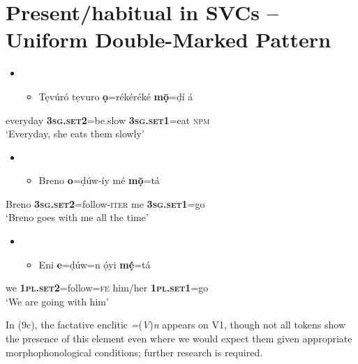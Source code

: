 \chapter[Present/habitual in SVCs – Uniform Double{}-Marked Pattern]{Present/habitual in SVCs – Uniform Double-Marked Pattern}
\label{bkm:Ref453835454}\begin{itemize}
\item \setcounter{itemize}{0}
\begin{itemize}
\item \gll Tẹvúró tẹvuro  \textbf{ọ}=rékéréké       \textbf{m\={o}̣}=ḍí       á\\
\end{itemize}
\end{itemize}
       everyday     \textbf{\textsc{3sg.set2}}=be.slow  \textbf{\textsc{3sg.set1}}=eat  \textsc{npm}\\
\glt ‘Everyday, she eats them slowly’ 
\z

\begin{itemize}
\item \setcounter{itemize}{0}
\begin{itemize}
\item \gll Breno   \textbf{o}=ḍúw-íy         mé   \textbf{m\={o}̣}=tá\\
\end{itemize}
\end{itemize}
       Breno   \textbf{\textsc{3sg.set2}}=follow-\textsc{iter  }me   \textbf{3}\textbf{\textsc{sg.set1}}\textsc{=}go\\
\glt ‘Breno goes with me all the time’
\z

\begin{itemize}
\item \setcounter{itemize}{0}
\begin{itemize}
\item \gll Eni   \textbf{e}=ḍúw=n       ọ́yi       \textbf{mẹ́}=tá\\
\end{itemize}
\end{itemize}
       we   \textbf{\textsc{1pl.set2}}=follow=\textsc{fe}   him/her    \textbf{\textsc{1pl.set1}}=go\\
\glt ‘We are going with him’
\z

In (9c), the factative enclitic \textit{=}(\textit{V})\textit{n} appears on V1, though not all tokens show the presence of this element even where we would expect them given appropriate morphophonological conditions; further research is required. 

